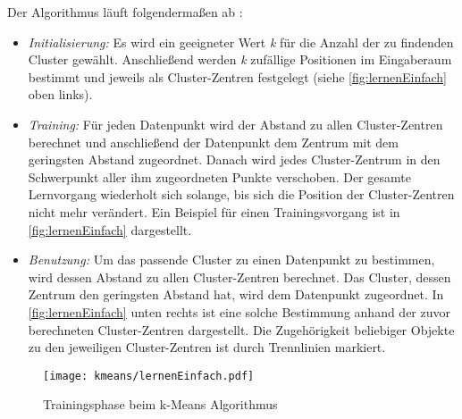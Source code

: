 Der Algorithmus läuft folgendermaßen ab \cite{Marsland}:
\begin{itemize}

\item \emph{Initialisierung:} Es wird ein geeigneter Wert \emph{k} für die Anzahl der zu findenden Cluster gewählt.
Anschließend werden \emph{k} zufällige Positionen im Eingaberaum bestimmt und jeweils als Cluster-Zentren festgelegt (siehe \autoref{fig:lernenEinfach} oben links).
\item \emph{Training:} Für jeden Datenpunkt wird der Abstand zu allen Cluster-Zentren berechnet und anschließend der Datenpunkt dem Zentrum mit dem geringsten Abstand zugeordnet. 
Danach wird jedes Cluster-Zentrum in den Schwerpunkt aller ihm zugeordneten Punkte verschoben.
Der gesamte Lernvorgang wiederholt sich solange, bis sich die Position der Cluster-Zentren nicht mehr verändert. 
Ein Beispiel für einen Trainingsvorgang ist in \autoref{fig:lernenEinfach} dargestellt.
\item \emph{Benutzung:} Um das passende Cluster zu einen Datenpunkt zu bestimmen, wird dessen Abstand zu allen Cluster-Zentren berechnet. Das Cluster, dessen Zentrum den geringsten Abstand hat, wird dem Datenpunkt zugeordnet. In \autoref{fig:lernenEinfach} unten rechts ist  eine solche Bestimmung anhand der zuvor berechneten Cluster-Zentren dargestellt. Die Zugehörigkeit beliebiger Objekte zu den jeweiligen Cluster-Zentren ist durch Trennlinien markiert.
\end{itemize}


\begin{figure*}[htbp]
    \centering
   \texttt{[image: kmeans/lernenEinfach.pdf]}
\caption{Trainingsphase beim k-Means Algorithmus}
\label{fig:lernenEinfach}
\end{figure*}



